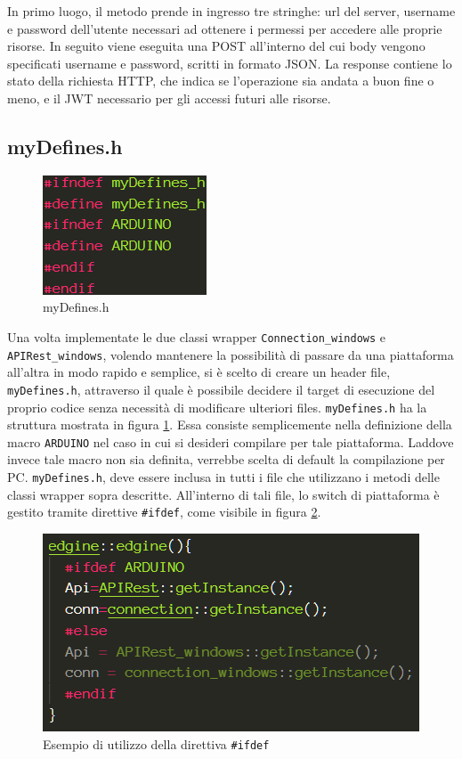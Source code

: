 In primo luogo, il metodo prende in ingresso tre stringhe: url del server, username e password dell'utente necessari ad ottenere i permessi per accedere alle proprie risorse. In seguito viene eseguita una POST all'interno del cui body vengono specificati username e password, scritti in formato JSON. La response contiene lo stato della richiesta HTTP, che indica se l'operazione sia andata a buon fine o meno, e il JWT necessario per gli accessi futuri alle risorse.
\subsection{myDefines.h}

\begin{figure}
	\centering
	\includegraphics{pics/myDefines}
	\caption{myDefines.h}
	\label{myDefines}
\end{figure}

Una volta implementate le due classi wrapper \texttt{Connection\_windows} e \\\texttt{APIRest\_windows}, volendo mantenere la possibilità di passare da una piattaforma all'altra in modo rapido e semplice, si è scelto di creare un header file, \texttt{myDefines.h}, attraverso il quale è possibile decidere il target di esecuzione del proprio codice senza necessità di modificare ulteriori files. \texttt{myDefines.h} ha la struttura mostrata in figura \ref{myDefines}. Essa consiste semplicemente nella definizione della macro \texttt{ARDUINO} nel caso in cui si desideri compilare per tale piattaforma. Laddove invece tale macro non sia definita, verrebbe scelta di default la compilazione per PC. \texttt{myDefines.h}, deve essere inclusa in tutti i file che utilizzano i metodi delle classi wrapper sopra descritte. All'interno di tali file, lo switch di piattaforma è gestito tramite direttive \texttt{\#ifdef}, come visibile in figura \ref{ifdef}.

\begin{figure}[H]
	\centering
	\includegraphics[width=0.66\linewidth]{pics/ifdef}
	\caption{Esempio di utilizzo della direttiva \texttt{\#ifdef}}
	\label{ifdef}
\end{figure}

